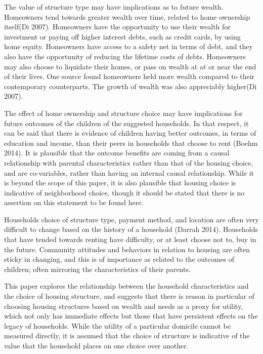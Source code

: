\documentclass{article}
\begin{document}
The value of structure type may have implications as to future wealth.  Homeowners tend towards greater wealth over time, related to home ownership itself(Di 2007).  Homeowners have the opportunity to use their wealth for investment or paying off higher interest debts, such as credit cards, by using home equity.  Homeowners have access to a safety net in terms of debt, and they also have the opportunity of reducing the lifetime costs of debts.  Homeowners may also choose to liquidate their homes, or pass on wealth at at or near the end of their lives.  One source found homeowners held more wealth compared to their contemporary counterparts.  The growth of wealth was also appreciably higher(Di 2007). 
  
The effect of home ownership and structure choice may have implications for future outcomes of the children of the suggested households.  In that respect, it can be said that there is evidence of children having better outcomes, in terms of education and income, than their peers in households that choose to rent (Boehm 2014).  It is plausible that the outcome benefits are coming from a causal relationship with parental characteristics rather than that of the housing choice, and are co-variables, rather than having an internal causal relationship.  While it is beyond the scope of this paper, it is also plausible that housing choice is indicative of neighborhood choice, though it should be stated that there is no assertion on this statement to be found here.

Households choice of structure type, payment method, and location are often very difficult to change based on the history of a household (Darrah 2014).  Households that have tended towards renting have difficulty, or at least choose not to, buy in the future.  Community attitudes and behaviors in relation to housing are often sticky in changing, and this is of importance as related to the outcomes of children; often mirroring the characteristics of their parents.  


This paper explores the relationship between the household characteristics and the choice of housing structure, and suggests that there is reason in particular of choosing housing structures based on wealth and needs as a proxy for utility, which not only has immediate effects but those that have persistent effects on the legacy of households.  While the utility of a particular domicile cannot be measured directly, it is assumed that the choice of structure is indicative of the value that the household places on one choice over another.  
\end{document}
